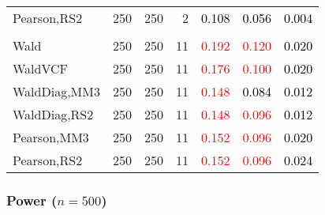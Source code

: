 \documentclass[
]{article}
\begin{document}
\begin{table}[H]
{\begin{tabular}[t]{lrrrrrr}
\hspace{1em}Pearson,RS2 & 250 & 250 & 2 & \textcolor{black}{0.108} & \textcolor{black}{0.056} & \textcolor{black}{0.004}\\
\addlinespace[0.3em]
\multicolumn{7}{l}{\textbf{3F 15V}}\\
\hspace{1em}Wald & 250 & 250 & 11 & \textcolor{red}{0.192} & \textcolor{red}{0.120} & \textcolor{black}{0.020}\\
\hspace{1em}WaldVCF & 250 & 250 & 11 & \textcolor{red}{0.176} & \textcolor{red}{0.100} & \textcolor{black}{0.020}\\
\hspace{1em}WaldDiag,MM3 & 250 & 250 & 11 & \textcolor{red}{0.148} & \textcolor{black}{0.084} & \textcolor{black}{0.012}\\
\hspace{1em}WaldDiag,RS2 & 250 & 250 & 11 & \textcolor{red}{0.148} & \textcolor{red}{0.096} & \textcolor{black}{0.012}\\
\hspace{1em}Pearson,MM3 & 250 & 250 & 11 & \textcolor{red}{0.152} & \textcolor{red}{0.096} & \textcolor{black}{0.020}\\
\hspace{1em}Pearson,RS2 & 250 & 250 & 11 & \textcolor{red}{0.152} & \textcolor{red}{0.096} & \textcolor{black}{0.024}\\
\bottomrule
\end{tabular}}
\endgroup{}
\end{table}

\hypertarget{power-n500-2}{%
\subsubsection{\texorpdfstring{Power
(\(n=500\))}{Power (n=500)}}\label{power-n500-2}}
\end{document}
